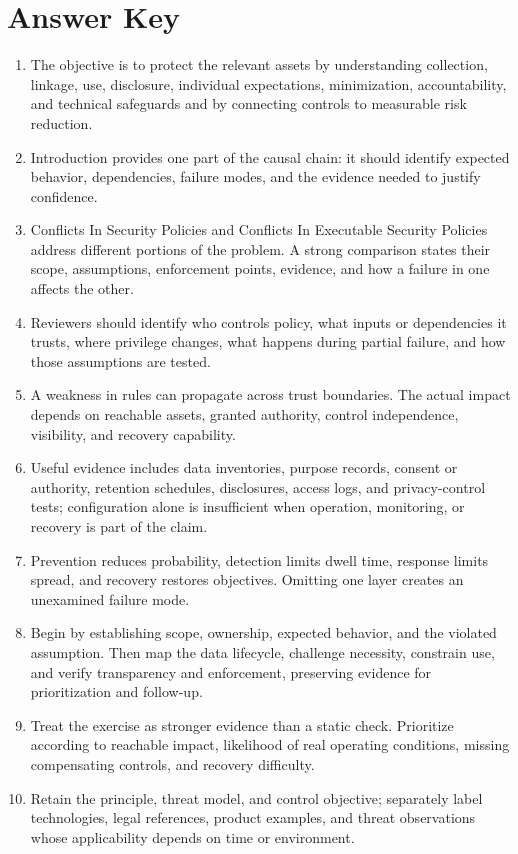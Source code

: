 \documentclass[11pt]{article}
\begin{document}
\section*{Answer Key}
\begin{enumerate}
\item The objective is to protect the relevant assets by understanding collection, linkage, use, disclosure, individual expectations, minimization, accountability, and technical safeguards and by connecting controls to measurable risk reduction.
\item Introduction provides one part of the causal chain: it should identify expected behavior, dependencies, failure modes, and the evidence needed to justify confidence.
\item Conflicts In Security Policies and Conflicts In Executable Security Policies address different portions of the problem. A strong comparison states their scope, assumptions, enforcement points, evidence, and how a failure in one affects the other.
\item Reviewers should identify who controls policy, what inputs or dependencies it trusts, where privilege changes, what happens during partial failure, and how those assumptions are tested.
\item A weakness in rules can propagate across trust boundaries. The actual impact depends on reachable assets, granted authority, control independence, visibility, and recovery capability.
\item Useful evidence includes data inventories, purpose records, consent or authority, retention schedules, disclosures, access logs, and privacy-control tests; configuration alone is insufficient when operation, monitoring, or recovery is part of the claim.
\item Prevention reduces probability, detection limits dwell time, response limits spread, and recovery restores objectives. Omitting one layer creates an unexamined failure mode.
\item Begin by establishing scope, ownership, expected behavior, and the violated assumption. Then map the data lifecycle, challenge necessity, constrain use, and verify transparency and enforcement, preserving evidence for prioritization and follow-up.
\item Treat the exercise as stronger evidence than a static check. Prioritize according to reachable impact, likelihood of real operating conditions, missing compensating controls, and recovery difficulty.
\item Retain the principle, threat model, and control objective; separately label technologies, legal references, product examples, and threat observations whose applicability depends on time or environment.
\end{enumerate}
\end{document}
